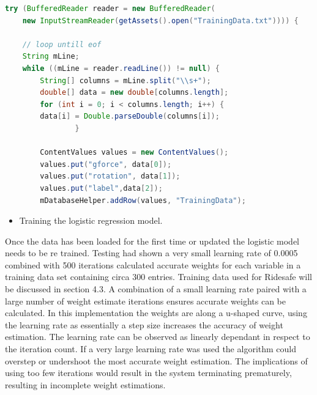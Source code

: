 \vspace{1cm}

\begin{lstlisting}[language=Java,basicstyle=\small, breaklines=true, label={lst:labell},caption={Loading Training Data from a file and storing in a database table}]
try (BufferedReader reader = new BufferedReader(
	new InputStreamReader(getAssets().open("TrainingData.txt")))) {
	
	// loop untill eof
	String mLine;
	while ((mLine = reader.readLine()) != null) {
		String[] columns = mLine.split("\\s+");
		double[] data = new double[columns.length];
		for (int i = 0; i < columns.length; i++) {
		data[i] = Double.parseDouble(columns[i]);
                }
           
		ContentValues values = new ContentValues();
		values.put("gforce", data[0]);
		values.put("rotation", data[1]);
		values.put("label",data[2]);
		mDatabaseHelper.addRow(values, "TrainingData");
\end{lstlisting}




\begin{itemize}
\item  {Training the logistic regression model.}
\end{itemize}


Once the data has been loaded for the first time or updated the logistic model needs to be re trained. Testing had shown a very small learning rate of 0.0005 combined with 500 iterations calculated accurate weights for each variable in a training data set containing circa 300 entries. Training data used for Ridesafe will be discussed in section 4.3. A combination of a small learning rate paired with a large number of weight estimate iterations ensures accurate weights can be calculated. In this implementation the weights are along a u-shaped curve, using the learning rate as essentially a step size increases the accuracy of weight estimation. The learning rate can be observed as linearly dependant in respect to the iteration count. If a very large learning rate was used the algorithm could overstep or undershoot  the most accurate weight estimation. The implications of using too few iterations would result in the system terminating prematurely, resulting in incomplete weight estimations.




